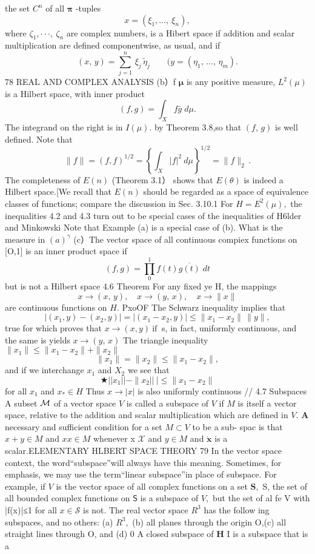 the set $C^{n}$ of all ${\boldsymbol{\pi}}$ -tuples $$ x=(\xi_{1},\dots,\ \xi_{n}), $$ where $\zeta_{1},\cdot\cdot\cdot,\ \zeta_{n}$ are complex numbers, is a Hibert space if addition and scalar multiplication are defined componentwise, as usual, and if $$ (x,\,y)=\sum_{j=1}^{n}\,\xi_{j}\,\tilde{\eta}_{j}\qquad(y=(\eta_{1},\,\ldots,\,\eta_{m}). $$$78$ REAL AND COMPLEX ANALYSIS (b）f ${\boldsymbol{\mu}}$ is any positive measure, $L^{2}(\mu)$ is a Hilbert space, with inner product $$ (f,g)=\int_{X}f{\bar{g}}\;d\mu. $$ The integrand on the right is in $\scriptstyle I(\mu).$ by Theorem 3.8,so that $(f,\,g)$ is well defined. Note that $$ \|f\|=(f,f)^{1/2}=\left\{\int_{X}|f|^{2}\ d\mu\right\}^{1/2}=\|f\|_{2}\,. $$ The completeness of $\scriptstyle{E(n)}$ (Theorem 3.1） shows that $\scriptstyle{E(\theta)}$ is indeed a Hilbert space.[We recall that $\scriptstyle{E(n)}$ should be regarded as a space of equivalence classes of functions; compare the discussion in Sec. 3.10.1 For $H=E^{2}(\mu),$ the inequalities 4.2 and 4.3 turn out to be special cases of the inequalities of H6lder and Minkowski Note that Example (a) is a special case of (b). What is the measure in $(a)^{\gamma}$ (c）The vector space of all continuous compiex functions on [O,1] is an inner product space if $$ (f,g)=\prod_{0}^{1}f(t){\overline{{g(t)}}}\;d t $$ but is not a Hilbert space 4.6 Theorem For any fixed ye H, the mappings $$ x\longrightarrow(x,\,y),\quad x\longrightarrow(y,\,x),\quad x\longrightarrow\|x\| $$ are continuous functions on $\textstyle H.$ PxoOF The Schwarz inequality implies that $$ |(x_{1},y)-(x_{2},y)|=|(x_{1}-x_{2},y)|\leq\|x_{1}-x_{2}\|\,\|y\|, $$ true for which proves that $x\to(x,y){\mathrm{~if~}}$ s, in fact, uniformly continuous, and the same is yields $x\to(y,\,x)$ The triangle inequality $\|x_{1}\|\leq\|x_{1}-x_{2}\|+\|x_{2}\|$ $$ \|x_{1}\|=\|x_{2}\|\leq\|x_{1}-x_{2}\|, $$ and if we interchange $x_{1}$ and $\scriptstyle{X_{2}}$ we see that $$ \bigstar||x_{1}||-\|x_{2}||\ |\leq\|x_{1}-x_{2}\| $$ for all $x_{1}$ and $x_{*}\in H$ Thus $x\to\left|x\right|$ is also uniformly continuous // 4.7 Subspaces A subset ${\cal M}$ of a vector space ${\mathbf{}}V$ is called a subspace of ${\mathbf{}}V$ if $\textstyle{M}$ is itself a vector space, relative to the addition and scalar multiplication which are defined in $V.$ $\mathbf{A}$ necessary and sufficient condition for a set $M\subset V$ to be a sub- spac is that $x+y\in M$ and $x x\in M$ whenever x $\scriptstyle{\mathcal{X}}$ and $y\in M$ and $\scriptstyle{\dot{\mathbf{x}}}$ is a scalar.ELEMENTARY HLBERT SPACE THEORY 79 In the vector space context, the word“subspace”will always have this meaning. Sometimes, for emphasis, we may use the term“linear subspace”in place of subspace. For example, if ${\mathbf{}}V$ is the vector space of all complex functions on a set ${\boldsymbol{S}},$ S, the set of all bounded complex functions on $\boldsymbol{\mathsf{S}}$ is a subspace of ${\mathit{V}},$ but the set of al fe V with |f(x)|≤1 for all $x\in{\mathcal{S}}$ is not. The real vector space $R^{3}$ has the follow ing subspaces, and no others: (a) $R^{3},$ (b) all planes through the origin O,(c) all straight lines through O, and (d) {0} A closed subspace of ${\boldsymbol{H}}$ I is a subspace that is a 